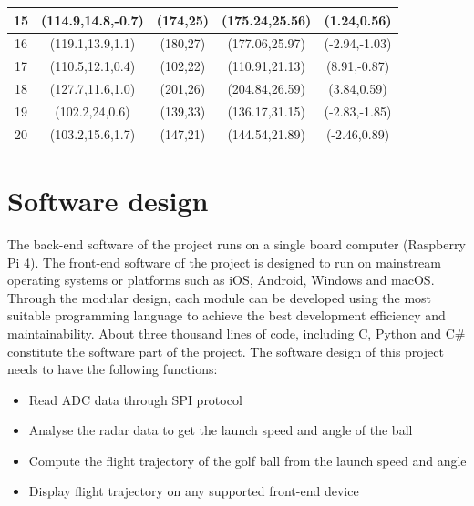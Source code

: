 \begin{table}[H]
\begin{tabular}{|c|c|c|c|c|}
15    & (114.9,14.8,-0.7) & (174,25)                                                          & (175.24,25.56)                                                    & (1.24,0.56)                                                   \\ \hline
16    & (119.1,13.9,1.1)  & (180,27)                                                          & (177.06,25.97)                                                    & (-2.94,-1.03)                                                 \\ \hline
17    & (110.5,12.1,0.4)  & (102,22)                                                          & (110.91,21.13)                                                    & (8.91,-0.87)                                                  \\ \hline
18    & (127.7,11.6,1.0)  & (201,26)                                                          & (204.84,26.59)                                                    & (3.84,0.59)                                                   \\ \hline
19    & (102.2,24,0.6)    & (139,33)                                                          & (136.17,31.15)                                                    & (-2.83,-1.85)                                                 \\ \hline
20    & (103.2,15.6,1.7)  & (147,21)                                                          & (144.54,21.89)                                                    & (-2.46,0.89)                                                  \\ \hline
\end{tabular}
\end{table}
\newpage
\section{Software design}
The back-end software of the project runs on a single board computer (Raspberry Pi 4). The front-end software of the project is designed to run on mainstream operating systems or platforms such as iOS, Android, Windows and macOS. Through the modular design, each module can be developed using the most suitable programming language to achieve the best development efficiency and maintainability. About three thousand lines of code, including C, Python and C\# constitute the software part of the project. The software design of this project needs to have the following functions: 
\begin{itemize}[noitemsep,topsep=0pt]
   \item Read ADC data through SPI protocol
   \item Analyse the radar data to get the launch speed and angle of the ball
   \item Compute the flight trajectory of the golf ball from the launch speed and angle
   \item Display flight trajectory on any supported front-end device
\end{itemize}
   
